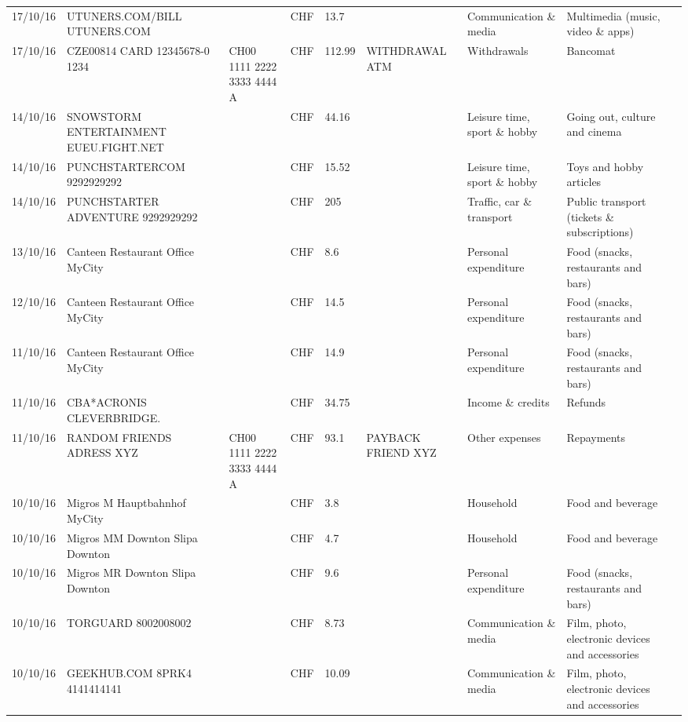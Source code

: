 \begin{landscape}
\begin{tiny}
\begin{longtable}{lp{4cm}llllp{3cm}ll}
		    17/10/16 & UTUNERS.COM/BILL          UTUNERS.COM &       & CHF   & 13.7  &       & Communication \& media & Multimedia (music, video \& apps) \\
		    17/10/16 & CZE00814 CARD 12345678-0 1234 & CH00 1111 2222 3333 4444 A & CHF   & 112.99 & WITHDRAWAL ATM & Withdrawals & Bancomat \\
		    14/10/16 & SNOWSTORM ENTERTAINMENT EUEU.FIGHT.NET &       & CHF   & 44.16 &       & Leisure time, sport \& hobby & Going out, culture and cinema \\
		    14/10/16 & PUNCHSTARTERCOM           9292929292 &       & CHF   & 15.52 &       & Leisure time, sport \& hobby & Toys and hobby articles \\
		    14/10/16 & PUNCHSTARTER ADVENTURE    9292929292 &       & CHF   & 205   &       & Traffic, car \& transport & Public transport (tickets \& subscriptions) \\
		    13/10/16 & Canteen Restaurant Office      MyCity &       & CHF   & 8.6   &       & Personal expenditure & Food (snacks, restaurants and bars) \\
		    12/10/16 & Canteen Restaurant Office      MyCity &       & CHF   & 14.5  &       & Personal expenditure & Food (snacks, restaurants and bars) \\
		    11/10/16 & Canteen Restaurant Office      MyCity &       & CHF   & 14.9  &       & Personal expenditure & Food (snacks, restaurants and bars) \\
		    11/10/16 & CBA*ACRONIS              CLEVERBRIDGE. &       & CHF   & 34.75 &       & Income \& credits & Refunds \\
		    11/10/16 & RANDOM FRIENDS ADRESS XYZ & CH00 1111 2222 3333 4444 A & CHF   & 93.1  & PAYBACK FRIEND XYZ & Other expenses & Repayments \\
		    10/10/16 & Migros M Hauptbahnhof    MyCity &       & CHF   & 3.8   &       & Household & Food and beverage \\
		    10/10/16 & Migros MM Downton Slipa   Downton &       & CHF   & 4.7   &       & Household & Food and beverage \\
		    10/10/16 & Migros MR Downton Slipa   Downton &       & CHF   & 9.6   &       & Personal expenditure & Food (snacks, restaurants and bars) \\
		    10/10/16 & TORGUARD                 8002008002 &       & CHF   & 8.73  &       & Communication \& media & Film, photo, electronic devices and accessories \\
		    10/10/16 & GEEKHUB.COM  8PRK4        4141414141 &       & CHF   & 10.09 &       & Communication \& media & Film, photo, electronic devices and accessories \\

\end{longtable}
\end{tiny}
\end{landscape}
